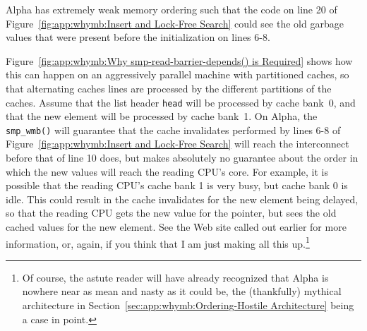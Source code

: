 Alpha has extremely weak memory ordering
such that the code on line 20 of
Figure~\ref{fig:app:whymb:Insert and Lock-Free Search} could see the old
garbage values that were present before the initialization on lines 6-8.

Figure~\ref{fig:app:whymb:Why smp-read-barrier-depends() is Required}
shows how this can happen on
an aggressively parallel machine with partitioned caches, so that
alternating caches lines are processed by the different partitions
of the caches.
Assume that the list header {\tt head} will be processed by cache bank~0,
and that the new element will be processed by cache bank~1.
On Alpha, the {\tt smp\_wmb()} will guarantee that the cache invalidates performed
by lines 6-8 of
Figure~\ref{fig:app:whymb:Insert and Lock-Free Search} will reach
the interconnect before that of line 10 does, but
makes absolutely no guarantee about the order in which the new values will
reach the reading CPU's core.
For example, it is possible that the reading CPU's cache bank 1 is very
busy, but cache bank 0 is idle.
This could result in the cache invalidates for the new element being
delayed, so that the reading CPU gets the new value for the pointer,
but sees the old cached values for the new element.
See the Web site called out earlier for more information,
or, again, if you think that I am just making all this up.\footnote{
	Of course, the astute reader will have already recognized that
	Alpha is nowhere near as mean and nasty as it could be,
	the (thankfully) mythical architecture in
	Section~\ref{sec:app:whymb:Ordering-Hostile Architecture}
	being a case in point.}

